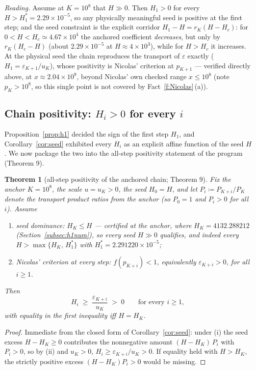 \documentclass[11pt]{article}
\newtheorem{theorem}{Theorem}[section]
\theoremstyle{remark}
\newcommand{\eps}{\varepsilon}
\begin{document}
\emph{Reading.} Assume at $K=10^8$ that $H\gg0$. Then $H_1>0$ for every
$H>H_1^{*}=2.29\times10^{-5}$, so any physically meaningful seed is positive
at the first step; and the seed constraint is the explicit corridor
$H_1-H=r_K(H-H_c)$: for $0<H<H_c\simeq4.67\times10^{4}$ the anchored
coefficient \emph{decreases}, but only by $r_K(H_c-H)$ (about
$2.29\times10^{-5}$ at $H\approx4\times10^{3}$), while for $H>H_c$ it
increases. At the physical seed the chain reproduces the transport of
$\eps$ exactly ($H_1=\eps_{K+1}/u_K$), whose positivity is Nicolas' criterion
at $p_{K+1}$ --- verified directly above, at $x\approx2.04\times10^{9}$,
beyond Nicolas' own checked range $x\le10^{8}$ (note $p_K>10^{8}$, so this
single point is not covered by Fact~\ref{f:Nicolas}\,(a)).

\subsection{Chain positivity: $H_i>0$ for every $i$}\label{subsec:hipos}

Proposition~\ref{prop:h1} decided the sign of the first step $H_1$, and
Corollary~\ref{cor:seed} exhibited every $H_i$ as an explicit affine
function of the seed $H$. We now package the two into the all-step
positivity statement of the program (Theorem 9).

\begin{theorem}[all-step positivity of the anchored chain; Theorem 9]\label{thm:chainpos}
Fix the anchor $K=10^8$, the scale $u=u_K>0$, the seed $H_0=H$, and let
$P_i\coloneqq P_{K+i}/P_K$ denote the transport product ratios from the
anchor (so $P_0=1$ and $P_i>0$ for all $i$). Assume
\begin{enumerate}
\item \emph{seed dominance}: $H_K\le H$ --- certified at the anchor, where
$H_K=4132.288212$ (Section~\ref{subsec:h1num}), so every seed $H\gg0$
qualifies, and indeed every $H>\max\{H_K,\,H_1^{*}\}$ with
$H_1^{*}=2.291220\times10^{-5}$;
\item \emph{Nicolas' criterion at every step}: $f(p_{K+i})<1$, equivalently
$\eps_{K+i}>0$, for all $i\ge1$.
\end{enumerate}
Then
\[
H_i\;\ge\;\frac{\eps_{K+i}}{u_K}\;>\;0\qquad\text{for every }i\ge1,
\]
with equality in the first inequality iff $H=H_K$.
\end{theorem}

\begin{proof}
Immediate from the closed form of Corollary~\ref{cor:seed}: under (i) the
seed excess $H-H_K\ge0$ contributes the nonnegative amount
$(H-H_K)\,P_i$ with $P_i>0$, so by (ii) and $u_K>0$,
$H_i\ge\eps_{K+i}/u_K>0$. If equality held with $H>H_K$, the strictly
positive excess $(H-H_K)P_i>0$ would be missing.
\end{proof}
\end{document}
